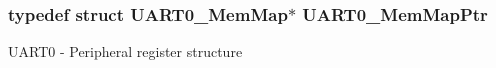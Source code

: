 \subsubsection[{\texorpdfstring{U\+A\+R\+T0\+\_\+\+Mem\+Map\+Ptr}{UART0_MemMapPtr}}]{\setlength{\rightskip}{0pt plus 5cm}typedef struct {\bf U\+A\+R\+T0\+\_\+\+Mem\+Map}$\ast$ {\bf U\+A\+R\+T0\+\_\+\+Mem\+Map\+Ptr}}\hypertarget{group___u_a_r_t0___peripheral_gae795171499e041fb9b8f6ad5b97f896b}{}\label{group___u_a_r_t0___peripheral_gae795171499e041fb9b8f6ad5b97f896b}
U\+A\+R\+T0 -\/ Peripheral register structure 